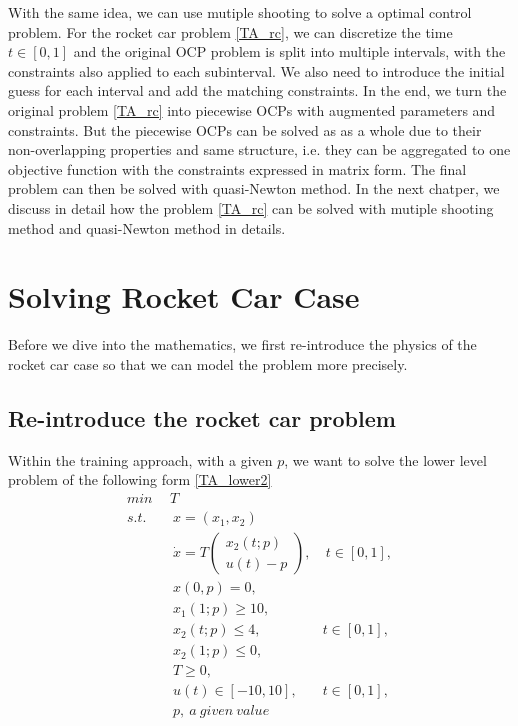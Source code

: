 \documentclass  [
  paper    = a4,
  BCOR     = 10mm,
  twoside,
  fontsize = 12pt,
  fleqn,
  toc      = bibnumbered,
  toc      = listofnumbered,
  numbers  = noendperiod,
  headings = normal,
  listof   = leveldown,
  version  = 3.03
]                                       {scrreprt}
\newcommand{\<}{\langle}
\renewcommand{\>}{\rangle}
\begin{document}
   
   With the same idea, we can use mutiple shooting to solve a optimal control problem. For the rocket car problem \ref{TA_rc}, we can discretize the time $t \in [0, 1]$ and the original OCP problem is split into multiple intervals, with the constraints also applied to each subinterval. We also need to introduce the initial guess for each interval and add the matching constraints. In the end, we turn the original problem  \ref{TA_rc} into piecewise OCPs with augmented parameters and constraints. But the piecewise OCPs can be solved as as a whole due to their non-overlapping properties and same structure, i.e. they can be aggregated to one objective function with the constraints expressed in matrix form. The final problem can then be solved with quasi-Newton method. In the next chatper, we discuss in detail how the problem \ref{TA_rc} can be solved with mutiple shooting method and quasi-Newton method in details. 
   
   
   \chapter{Solving Rocket Car Case}
   Before we dive into the mathematics, we first re-introduce the physics of the rocket car case so that we can model the problem more precisely. 
   \section{Re-introduce the rocket car problem}
   Within the training approach, with a given $p$, we want to solve the lower level problem of the following form \ref{TA_lower2}
   \begin{subequations}
   	\begin{align}
   	\underset{}{min} \   & \  T \\ 
   	s.t.  & \ \ x = (x_1, x_2)   \label{ta_rc_x} \\ 
   	& \ \  \dot{x} = T  \begin{pmatrix}  x_2(t;p) \\ u(t)-p   \end{pmatrix}, & \ t \in [0,1],  \label{ta_rc_partial2} \\
   	& \ \ x(0,p) = 0, \label{ta_rc_t2}\\
   	& \ \ x_1(1;p) \geq 10, \label{ta_rc_x1_t2} \\
   	& \ \ x_2(t;p) \leq 4, & t \in [0,1], \label{ta_rc_x2_tc2} \\
   	& \ \ x_2(1;p) \leq 0, \label{ta_rc_x2_t1_2}  \\
   	& \ \ T \geq 0, \\
   	& \ \ u(t) \in [-10, 10], & t \in [0,1], \label{ta_ut}\\
   	& \ \ p, \   a \ given \ value
   	\end{align}
   	\label{TA_lower2}
   \end{subequations}
   
\end{document}
